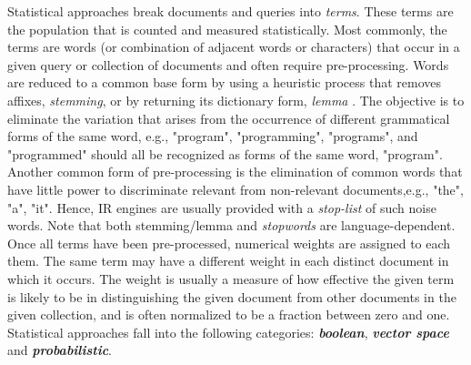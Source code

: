 Statistical approaches break documents and queries into \textit{terms}. These terms are the population that is counted and measured statistically. Most commonly, the terms are words (or combination of adjacent words or characters) that occur in a given query or collection of documents and often require pre-processing. Words are reduced to a common base form by using a heuristic process that removes affixes, \textit{stemming}, or by returning its dictionary form, \textit{lemma} \citep{porter1997}. The objective is to eliminate the variation that arises from the occurrence of different grammatical  forms  of  the  same  word,  e.g.,  "program",  "programming",  "programs", and "programmed" should all be recognized as forms of the same word, "program". Another common form of pre-processing is the elimination of common words that have little power to discriminate relevant from non-relevant documents,e.g., "the", "a", "it". Hence, IR engines are usually provided with a \textit{stop-list} of such noise words. Note that both stemming/lemma and \textit{stopwords} are language-dependent. Once all terms have been pre-processed, numerical weights are assigned to each them. The same term may have a different weight in each distinct document in which it occurs. The weight is usually a measure of how effective the given term is likely to be in distinguishing the given document from other documents in the given collection, and is often normalized to be a fraction between zero and one. Statistical approaches fall into the following categories: \textbf{\textit{boolean}}, \textbf{\textit{vector space}} and \textbf{\textit{probabilistic}}.


